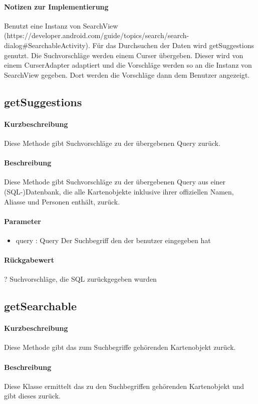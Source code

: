 \paragraph*{Notizen zur Implementierung}
Benutzt eine Instanz von SearchView (https://developer.android.com/guide/topics/search/search-dialog#SearchableActivity).
Für das Durchsuchen der Daten wird getSuggestions genutzt.
Die Suchvorschläge werden einem Curser übergeben.
Dieser wird von einem CurserAdapter adaptiert und die Vorschläge werden so an die Instanz von SearchView gegeben.
Dort werden die Vorschläge dann dem Benutzer angezeigt.

\subsection{getSuggestions}%
\paragraph*{Kurzbeschreibung}
Diese Methode gibt Suchvorschläge zu der übergebenen Query zurück.
\paragraph*{Beschreibung}
Diese Methode gibt Suchvorschläge zu der übergebenen Query aus einer (SQL-)Datenbank, die alle Kartenobjekte inklusive ihrer offiziellen Namen, Aliasse und Personen enthält, zurück.
\paragraph*{Parameter}
\begin{itemize}
    \item query : Query Der Suchbegriff den der benutzer eingegeben hat
\end{itemize}
\paragraph*{Rückgabewert}
? Suchvorschläge, die SQL zurückgegeben wurden

\subsection{getSearchable}%
\paragraph*{Kurzbeschreibung}
Diese Methode gibt das zum Suchbegriffe gehörenden Kartenobjekt zurück.
\paragraph*{Beschreibung}
Diese Klasse ermittelt das zu den Suchbegriffen gehörenden Kartenobjekt und gibt dieses zurück.
